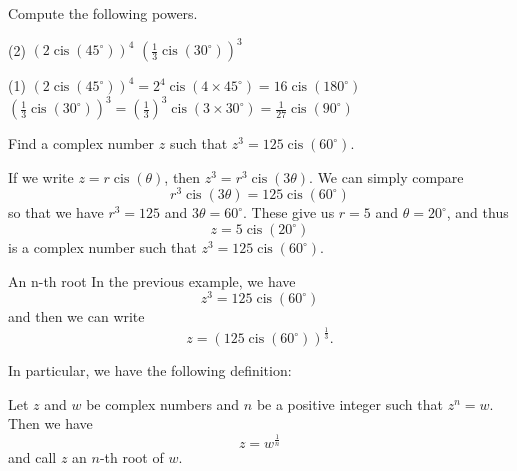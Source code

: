 \begin{frame}[t]
\begin{ex}
Compute the following powers.
\begin{tasks}(2)
\task $(2\operatorname{cis}\!\left(45^\circ\right))^4$
\task $\left(\frac{1}{3} \operatorname{cis}\!\left(30^\circ\right) \right)^3$
\end{tasks}
\end{ex}
\begin{sol}
\begin{tasks}(1)
\task $(2\operatorname{cis}\!\left(45^\circ\right))^4 = 2^4 \operatorname{cis}\!\left(4 \times 45^\circ\right) = 16\operatorname{cis}\!\left(180^\circ\right)$
\task $\left(\frac{1}{3} \operatorname{cis}\!\left(30^\circ\right) \right)^3 = \left(\frac{1}{3}\right)^3 \operatorname{cis}\!\left(3 \times 30^\circ\right) = \frac{1}{27} \operatorname{cis}\!\left(90^\circ\right)$
\end{tasks}
\end{sol}
\end{frame}


\begin{frame}[t]
\begin{ex}
Find a complex number $z$ such that $z^3 = 125 \operatorname{cis}\!\left(60^\circ\right)$.
\end{ex}
\begin{sol}
If we write $z = r\operatorname{cis}\!\left(\theta\right)$, then $z^3 = r^3 \operatorname{cis}\!\left(3\theta\right)$. We can simply compare
\[r^3 \operatorname{cis}\!\left(3\theta\right) = 125 \operatorname{cis}\!\left(60^\circ\right)\]
so that we have $r^3=125$ and $3\theta = 60^\circ$. These give us $r=5$ and $\theta = 20^\circ$, and thus
\[z = 5 \operatorname{cis}\!\left(20^\circ\right)\]
is a complex number such that $z^3 = 125 \operatorname{cis}\!\left(60^\circ\right)$.
\end{sol}
\end{frame}

\begin{frame}{An n-th root}
In the previous example, we have
\[ z^3 = 125 \operatorname{cis}\!\left(60^\circ\right) \]
and then we can write
\[z = (125 \operatorname{cis}\!\left(60^\circ\right)) ^{\frac{1}{3}}.\]

In particular, we have the following definition:
\begin{defn}{}{}
Let $z$ and $w$ be complex numbers and $n$ be a positive integer such that $z^n = w$. Then we have
\[z = w^{\frac{1}{n}}\]
and call $z$ an $n$-th root of $w$.
\end{defn}
\end{frame}

